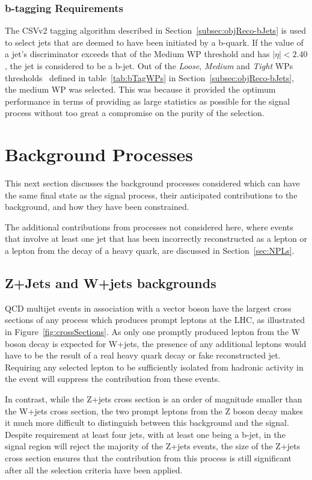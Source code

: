 \subsubsection{b-tagging Requirements}\label{subsubsec:bTag}
The CSVv2 tagging algorithm described in Section~\ref{subsec:objReco-bJets} is used to select jets that are deemed to have been initiated by a b-quark.
If the value of a jet's discriminator exceeds that of the Medium WP threshold and has $|\eta| < 2.40$, the jet is considered to be a b-jet.
Out of the \emph{Loose}, \emph{Medium} and \emph{Tight} WPs thresholds~\cite{Sirunyan:2017ezt} defined in table~\ref{tab:bTagWPs} in Section~\ref{subsec:objReco-bJets}, the medium WP was selected.
This was because it provided the optimum performance in terms of providing as large statistics as possible for the signal process without too great a compromise on the purity of the selection.

\section{Background Processes}\label{sec:backgroundProcesses}
This next section discusses the background processes considered which can have the same final state as the signal process, their anticipated contributions to the background, and how they have been constrained.

The additional contributions from processes not considered here, where events that involve at least one jet that has been incorrectly reconstructed as a lepton or a lepton from the decay of a heavy quark, are discussed in Section~\ref{sec:NPLs}.

\subsection{Z+Jets and W+jets backgrounds}
QCD multijet events in association with a vector boson have the largest cross sections of any process which produces prompt leptons at the LHC, as illustrated in Figure~\ref{fig:crossSections}.
As only one promptly produced lepton from the W boson decay is expected for W+jets, the presence of any additional leptons would have to be the result of a real heavy quark decay or fake reconstructed jet. 
Requiring any selected lepton to be sufficiently isolated from hadronic activity in the event will suppress the contribution from these events.

In contrast, while the Z+jets cross section is an order of magnitude smaller than the W+jets cross section, the two prompt leptons from the Z boson decay makes it much more difficult to distinguish between this background and the signal.
Despite requirement at least four jets, with at least one being a b-jet, in the signal region will reject the majority of the Z+jets events, the size of the Z+jets cross section ensures that the contribution from this process is still significant after all the selection criteria have been applied.

